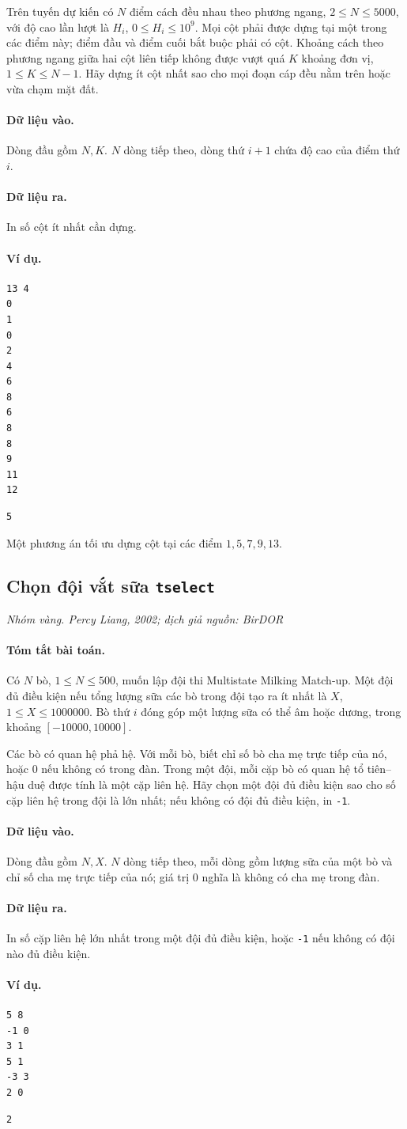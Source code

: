 \documentclass[11pt]{article}
\newcommand{\problem}[4]{%
  \subsection[#1 (#2)]{#1 \hfill {\normalsize\texttt{#2}}}%
  \noindent\textit{#3. #4}\par\smallskip
}
\newcommand{\iosec}[1]{\paragraph{#1}}
\begin{document}
Trên tuyến dự kiến có \(N\) điểm cách đều nhau theo phương ngang,
\(2\le N\le 5000\), với độ cao lần lượt là \(H_i\),
\(0\le H_i\le 10^9\). Mọi cột phải được dựng tại một trong các điểm này; điểm
đầu và điểm cuối bắt buộc phải có cột. Khoảng cách theo phương ngang giữa hai
cột liên tiếp không được vượt quá \(K\) khoảng đơn vị, \(1\le K\le N-1\). Hãy
dựng ít cột nhất sao cho mọi đoạn cáp đều nằm trên hoặc vừa chạm mặt đất.

\iosec{Dữ liệu vào.}
Dòng đầu gồm \(N,K\). \(N\) dòng tiếp theo, dòng thứ \(i+1\) chứa độ cao của
điểm thứ \(i\).

\iosec{Dữ liệu ra.}
In số cột ít nhất cần dựng.

\iosec{Ví dụ.}
\begin{verbatim}
13 4
0
1
0
2
4
6
8
6
8
8
9
11
12
\end{verbatim}

\begin{verbatim}
5
\end{verbatim}

Một phương án tối ưu dựng cột tại các điểm \(1,5,7,9,13\).

\problem{Chọn đội vắt sữa}{tselect}{Nhóm vàng}{Percy Liang, 2002; dịch giả nguồn: BirDOR}

\iosec{Tóm tắt bài toán.}
Có \(N\) bò, \(1\le N\le 500\), muốn lập đội thi Multistate Milking Match-up.
Một đội đủ điều kiện nếu tổng lượng sữa các bò trong đội tạo ra ít nhất là
\(X\), \(1\le X\le 1000000\). Bò thứ \(i\) đóng góp một lượng sữa có thể âm
hoặc dương, trong khoảng \([-10000,10000]\).

Các bò có quan hệ phả hệ. Với mỗi bò, biết chỉ số bò cha mẹ trực tiếp của nó,
hoặc \(0\) nếu không có trong đàn. Trong một đội, mỗi cặp bò có quan hệ tổ
tiên--hậu duệ được tính là một cặp liên hệ. Hãy chọn một đội đủ điều kiện sao
cho số cặp liên hệ trong đội là lớn nhất; nếu không có đội đủ điều kiện, in
\texttt{-1}.

\iosec{Dữ liệu vào.}
Dòng đầu gồm \(N,X\). \(N\) dòng tiếp theo, mỗi dòng gồm lượng sữa của một bò
và chỉ số cha mẹ trực tiếp của nó; giá trị \(0\) nghĩa là không có cha mẹ trong
đàn.

\iosec{Dữ liệu ra.}
In số cặp liên hệ lớn nhất trong một đội đủ điều kiện, hoặc \texttt{-1} nếu
không có đội nào đủ điều kiện.

\iosec{Ví dụ.}
\begin{verbatim}
5 8
-1 0
3 1
5 1
-3 3
2 0
\end{verbatim}

\begin{verbatim}
2
\end{verbatim}
\end{document}
